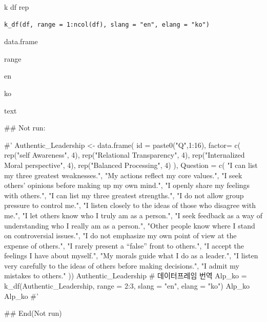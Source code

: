\documentclass[a4paper]{book}
\begin{document}
%
\begin{Description}
k df rep
\end{Description}
%
\begin{Usage}
\begin{verbatim}
k_df(df, range = 1:ncol(df), slang = "en", elang = "ko")
\end{verbatim}
\end{Usage}
%
\begin{Arguments}
\begin{ldescription}
\item[\code{df}] data.frame

\item[\code{range}] range

\item[\code{slang}] en

\item[\code{elang}] ko
\end{ldescription}
\end{Arguments}
%
\begin{Value}
text
\end{Value}
%
\begin{Examples}
\begin{ExampleCode}

\#\# Not run: 

#'
Authentic_Leadership <- data.frame(
  id = paste0("Q",1:16),
  factor= c(
    rep("self Awareness", 4),
    rep("Relational Transparency", 4),
    rep("Internalized Moral perspective", 4),
    rep("Balanced Processing", 4)
  ),
  Question = c(
    "I can list my three greatest weaknesses.",
    "My actions reflect my core values.",
    "I seek others' opinions before making up my own mind.",
    "I openly share my feelings with others.",
    "I can list my three greatest strengths.",
    "I do not allow group pressure to control me.",
    "I listen closely to the ideas of those who disagree with me.",
    "I let others know who I truly am as a person.",
    "I seek feedback as a way of understanding who I really am as a person.",
    "Other people know where I stand on controversial issues.",
    "I do not emphasize my own point of view at the expense of others.",
    "I rarely present a “false” front to others.",
    "I accept the feelings I have about myself.",
    "My morals guide what I do as a leader.",
    "I listen very carefully to the ideas of others before making decisions.",
    "I admit my mistakes to others."
  ))%
Authentic_Leadership
# 데이터프레임 번역
Alp_ko = k_df(Authentic_Leadership,
              range = 2:3,
              slang = "en",
              elang = "ko") %
Alp_ko
Alp_ko %
#'






## End(Not run)




\end{ExampleCode}
\end{Examples}
\end{document}
